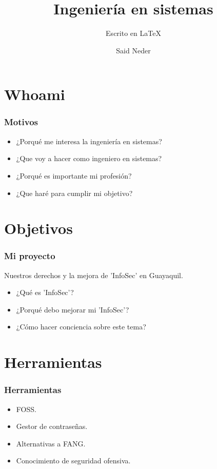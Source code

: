 \documentclass{beamer}
\title{Ingeniería en sistemas}
\author{Said Neder}
\subtitle{Escrito en \LaTeX}
\institute[\href{https://www.soler.edu.ec/}{Soler Lux Dei}]{Soler Lux Dei\\ \href{https://github.com/crazyc4t/presentacionppe}{\tiny https://github.com/crazyc4t/presentacionppe}}
\begin{document}
\maketitle

\section{Whoami}

\begin{frame}
\frametitle{Motivos}

\begin{itemize}
\item ¿Porqué me interesa la ingeniería en sistemas?
\item ¿Que voy a hacer como ingeniero en sistemas?
\item ¿Porqué es importante mi profesión?
\item ¿Que haré para cumplir mi objetivo?
\end{itemize}

\end{frame}

\section{Objetivos}

\begin{frame}
\frametitle{Mi proyecto}

Nuestros derechos y la mejora de 'InfoSec' en Guayaquil.\\

\begin{itemize}
\item ¿Qué es 'InfoSec'?
\item ¿Porqué debo mejorar mi 'InfoSec'?
\item ¿Cómo hacer conciencia sobre este tema?
\end{itemize}

\end{frame}

\section{Herramientas}

\begin{frame}
 \frametitle{Herramientas}
 \begin{itemize}
  \item FOSS.
  \item Gestor de contraseñas.
  \item Alternativas a FANG.
  \item Conocimiento de seguridad ofensiva.
 \end{itemize}

\end{frame}
\end{document}
